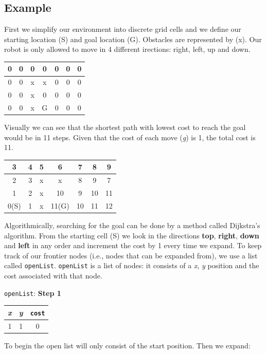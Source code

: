 \documentclass[twoside,11pt]{article}
\begin{document}
\subsection*{Example}
First we simplify our environment into discrete grid cells and we define our starting location (S) and goal location (G). Obstacles are represented by (x). Our robot is only allowed to move in 4 different irections: right, left, up and down. 
\begin{table}[ht]
	\label{tab:map-1}
	\begin{center}
		\begin{tabular}{|c|c|c|c|c|c|c|}
			\hline
			0 & 0 & 0 & 0 & 0 & 0 & 0 \\
			\hline
			0 & 0 & x & x & 0 & 0 & 0 \\
			\hline
			0 & 0 & x & 0 & 0 & 0 & 0 \\
			\hline
			0 & 0 & x & G & 0 & 0 & 0 \\
			\hline
		\end{tabular}
	\end{center}
\end{table}
Visually we can see that the shortest path with lowest cost to reach the goal would be in 11 steps. Given that the cost of each move (\textit{g}) is 1, the total cost is 11.
\begin{table}[ht]
	\label{tab:map-2}
	\begin{center}
		\begin{tabular}{|c|c|c|c|c|c|c|}
			\hline
			3 & 4 & 5 & 6 & 7 & 8 & 9 \\
			\hline
			2 & 3 & x & x & 8 & 9 & 7 \\
			\hline
			1 & 2 & x & 10 & 9 & 10 & 11 \\
			\hline
			0(S) & 1 & x & 11(G) & 10 & 11 & 12 \\
			\hline
		\end{tabular}
	\end{center}
\end{table}
Algorithmically, searching for the goal can be done by a method called Dijkstra’s algorithm. From the starting cell (S) we look in the directions \textbf{top}, \textbf{right}, \textbf{down} and \textbf{left} in any order and increment the cost by 1 every time we expand. To keep track of our frontier nodes (i.e., nodes that can be
expanded from), we use a list called \texttt{openList}. \texttt{openList} is a list of nodes: it consists of a \textit{x}, \textit{y} position and the cost associated with that node.

\texttt{openList}: \textbf{Step 1}
\begin{table}[ht]
	\label{tab:step-1}
	\begin{center}
		\begin{tabular}{|c|c|c|}
			\hline
			\textit{x} & \textit{y} & \texttt{cost} \\
			\hline
			1 & 1 & 0\\
			\hline
		\end{tabular}
	\end{center}
\end{table}
\newline To begin the open list will only consist of the start position. Then we expand:
\end{document}
